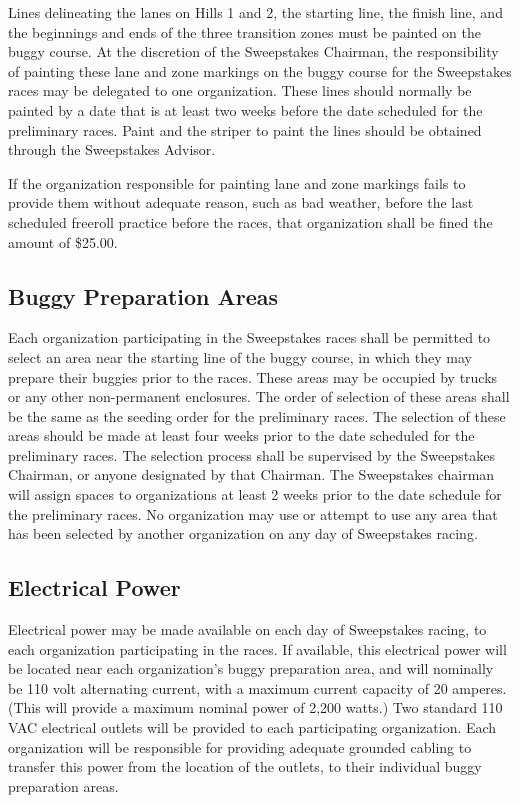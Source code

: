 Lines delineating the lanes on Hills 1 and 2, the starting line, the finish line, and the beginnings and ends of the three transition zones must be painted on the buggy course. At the discretion of the Sweepstakes Chairman, the responsibility of painting these lane and zone markings on the buggy course for the Sweepstakes races may be delegated to one organization. These lines should normally be painted by a date that is at least two weeks before the date scheduled for the preliminary races. Paint and the striper to paint the lines should be obtained through the Sweepstakes Advisor.

If the organization responsible for painting lane and zone markings fails to provide them without adequate reason, such as bad weather, before the last scheduled freeroll practice before the races, that organization shall be fined the amount of \$25.00.

\subsection{Buggy Preparation Areas}

Each organization participating in the Sweepstakes races shall be permitted to select an area near the starting line of the buggy course, in which they may prepare their buggies prior to the races. These areas may be occupied by trucks or any other non-permanent enclosures. The order of selection of these areas shall be the same as the seeding order for the preliminary races. The selection of these areas should be made at least four weeks prior to the date scheduled for the preliminary races. The selection process shall be supervised by the Sweepstakes Chairman, or anyone designated by that Chairman. The Sweepstakes chairman will assign spaces to organizations at least 2 weeks prior to the date schedule for the preliminary races. No organization may use or attempt to use any area that has been selected by another organization on any day of Sweepstakes racing.

\subsection{Electrical Power}

Electrical power may be made available on each day of Sweepstakes racing, to each organization participating in the races. If available, this electrical power will be located near each organization's buggy preparation area, and will nominally be 110 volt alternating current, with a maximum current capacity of 20 amperes. (This will provide a maximum nominal power of 2,200 watts.) Two standard 110 VAC electrical outlets will be provided to each participating organization. Each organization will be responsible for providing adequate grounded cabling to transfer this power from the location of the outlets, to their individual buggy preparation areas.

